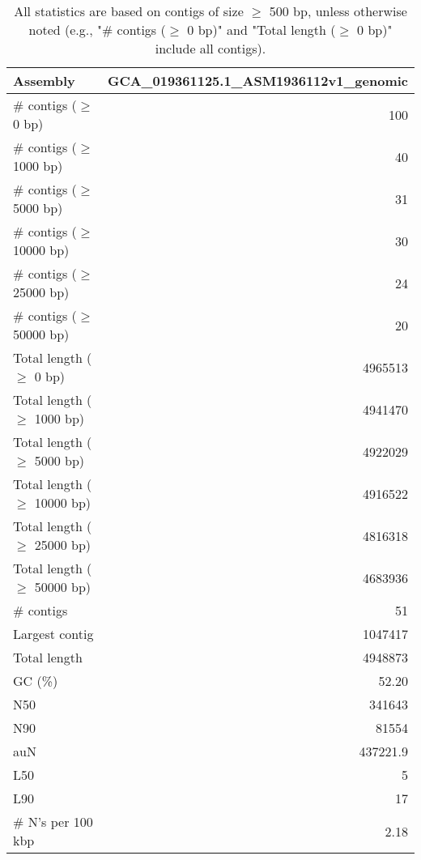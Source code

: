 \documentclass[12pt,a4paper]{article}
\begin{document}
\begin{table}[ht]
\begin{center}
\caption{All statistics are based on contigs of size $\geq$ 500 bp, unless otherwise noted (e.g., "\# contigs ($\geq$ 0 bp)" and "Total length ($\geq$ 0 bp)" include all contigs).}
\begin{tabular}{|l*{1}{|r}|}
\hline
Assembly & GCA\_019361125.1\_ASM1936112v1\_genomic \\ \hline
\# contigs ($\geq$ 0 bp) & 100 \\ \hline
\# contigs ($\geq$ 1000 bp) & 40 \\ \hline
\# contigs ($\geq$ 5000 bp) & 31 \\ \hline
\# contigs ($\geq$ 10000 bp) & 30 \\ \hline
\# contigs ($\geq$ 25000 bp) & 24 \\ \hline
\# contigs ($\geq$ 50000 bp) & 20 \\ \hline
Total length ($\geq$ 0 bp) & 4965513 \\ \hline
Total length ($\geq$ 1000 bp) & 4941470 \\ \hline
Total length ($\geq$ 5000 bp) & 4922029 \\ \hline
Total length ($\geq$ 10000 bp) & 4916522 \\ \hline
Total length ($\geq$ 25000 bp) & 4816318 \\ \hline
Total length ($\geq$ 50000 bp) & 4683936 \\ \hline
\# contigs & 51 \\ \hline
Largest contig & 1047417 \\ \hline
Total length & 4948873 \\ \hline
GC (\%) & 52.20 \\ \hline
N50 & 341643 \\ \hline
N90 & 81554 \\ \hline
auN & 437221.9 \\ \hline
L50 & 5 \\ \hline
L90 & 17 \\ \hline
\# N's per 100 kbp & 2.18 \\ \hline
\end{tabular}
\end{center}
\end{table}
\end{document}
